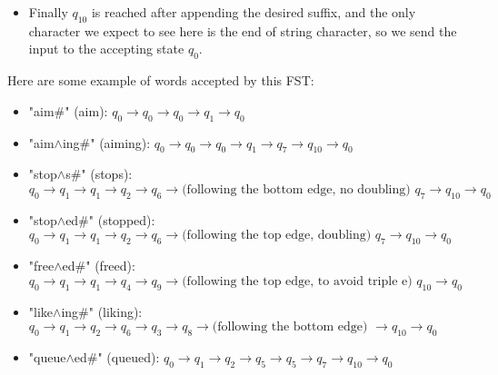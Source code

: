 \documentclass[11pt,journal]{article}
\begin{document}
\begin{itemize}
		\item Finally $q_{10}$ is reached after appending the desired suffix, and the only character we expect to see here is the end of string character, so we send the input to the accepting state $q_0$.
	
	\end{itemize}

	Here are some example of words accepted by this FST:
	\begin{itemize}
		\item "aim\#" (aim): $q_0 \rightarrow q_0 \rightarrow q_0 \rightarrow q_1 \rightarrow q_0$
		
		\item "aim$\wedge$ing\#" (aiming): $q_0 \rightarrow q_0\rightarrow q_0 \rightarrow  q_1 \rightarrow q_7 \rightarrow q_{10} \rightarrow q_0$
		
		\item "stop$\wedge$s\#" (stops): $q_0 \rightarrow q_1 \rightarrow q_1\rightarrow  q_2 \rightarrow  q_6 \rightarrow  \text{(following the bottom edge, no doubling) } q_7\rightarrow  q_{10} \rightarrow  q_0$
		
		\item "stop$\wedge$ed\#" (stopped): $q_0 \rightarrow q_1 \rightarrow  q_1 \rightarrow q_2 \rightarrow q_6 \rightarrow  \text{(following the top edge, doubling) } q_7\rightarrow  q_{10} \rightarrow  q_0$
		
		\item "free$\wedge$ed\#" (freed): $q_0\rightarrow q_1 \rightarrow  q_1 \rightarrow q_4 \rightarrow  q_9 \rightarrow \text{(following the top edge, to avoid triple e) } q_{10} \rightarrow  q_0$
		
		\item "like$\wedge$ing\#" (liking): $q_0 \rightarrow q_1 \rightarrow q_2\rightarrow q_6 \rightarrow  q_3 \rightarrow q_8 \rightarrow  \text{(following the bottom edge) } \rightarrow q_{10} \rightarrow  q_0$
		
		\item "queue$\wedge$ed\#" (queued): $q_0 \rightarrow q_1 \rightarrow q_2 \rightarrow q_5 \rightarrow q_5 \rightarrow q_7 \rightarrow q_{10} \rightarrow q_0$
	\end{itemize}
	
	
	

	
\end{document}
